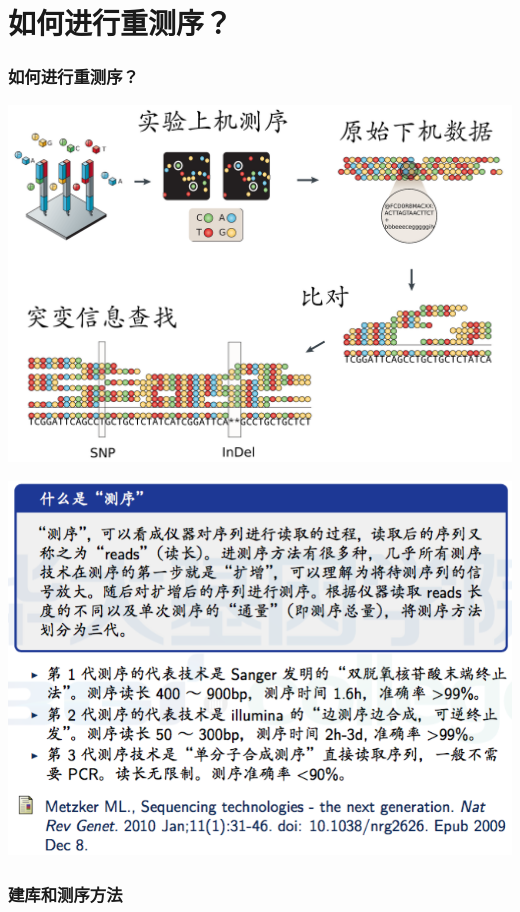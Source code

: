 \documentclass[12pt]{beamer}
\begin{document}
\section{如何进行重测序？}
\begin{frame}\frametitle{如何进行重测序？}
  \includegraphics[width=\textwidth]{figures/reseq-pip.png}
\end{frame}

\begin{frame}
  \includegraphics[width=\textwidth]{figures/old_slides/seq.png}
\end{frame}

\begin{frame}\frametitle{建库和测序方法}
\end{frame}
\end{document}
